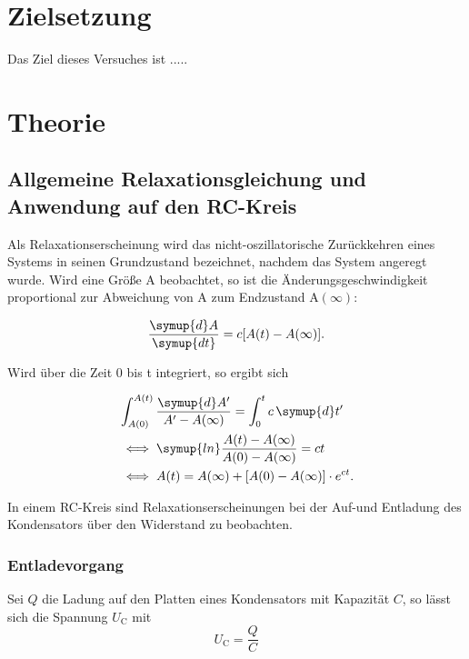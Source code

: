 \section{Zielsetzung}
Das Ziel dieses Versuches ist .....
\section{Theorie}

\subsection{Allgemeine Relaxationsgleichung und Anwendung auf den RC-Kreis}
Als Relaxationserscheinung wird das nicht-oszillatorische Zurückkehren eines Systems in seinen Grundzustand bezeichnet, nachdem das System angeregt wurde.
Wird eine Größe A beobachtet, so ist die Änderungsgeschwindigkeit proportional zur Abweichung von A zum Endzustand $\text{A}(\infty)$:

\begin{equation}
\frac{\symup{d}A}{\symup{dt}} = c[A(t) -A(\infty)].
\end{equation}

Wird über die Zeit 0 bis t integriert, so ergibt sich

\begin{equation}
\begin{aligned}
&\int_{A(0)}^{A(t)} \frac{\symup{d}A'}{A' - A(\infty)} = \int_0^t c \, \symup{d}t' \\
&\iff \symup{ln} \frac{A(t) - A(\infty)}{A(0) - A(\infty)} = ct \\
&\iff A(t) = A(\infty) + [A(0) - A(\infty)] \cdot e^{ct}.
\end{aligned}
\end{equation}

In einem RC-Kreis sind Relaxationserscheinungen bei der Auf-und Entladung des Kondensators über den Widerstand zu beobachten.

\subsubsection{Entladevorgang}
\label{eq:entladung}
Sei $Q$ die Ladung auf den Platten eines Kondensators mit Kapazität $C$, so lässt sich die Spannung $U_{\text{C}}$ mit
\begin{equation}
U_{\text{C}} = \frac{Q}{C}
\label{eq:spannungc}
\end{equation}

